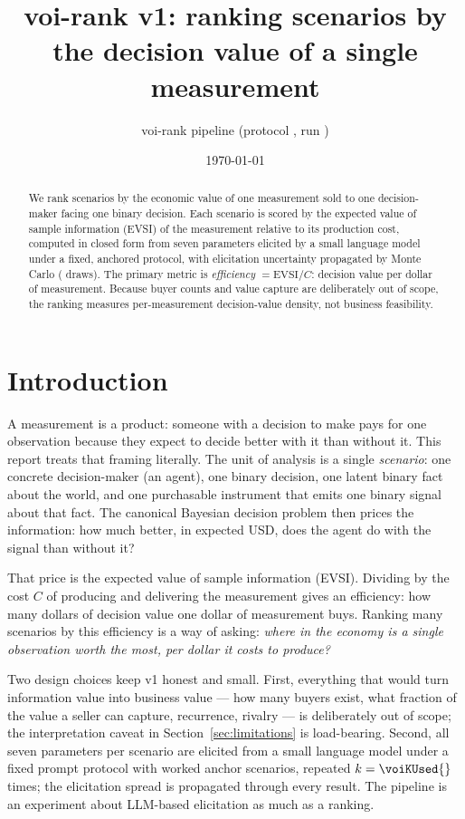 \documentclass[11pt]{article}
\title{voi-rank v1: ranking scenarios by the decision value of a single measurement}
\author{voi-rank pipeline (protocol \voiProtocol, run \voiRunId)}
\date{\today}
\newcommand{\evsi}{\mathrm{EVSI}}
\begin{document}
\maketitle

\begin{abstract}
We rank \voiNRanked{} scenarios by the economic value of one measurement sold to
one decision-maker facing one binary decision. Each scenario is scored by the
expected value of sample information (EVSI) of the measurement relative to its
production cost, computed in closed form from seven parameters elicited by a
small language model under a fixed, anchored protocol, with elicitation
uncertainty propagated by Monte Carlo (\voiNDraws{} draws). The primary metric
is \emph{efficiency} $=\evsi/C$: decision value per dollar of measurement.
Because buyer counts and value capture are deliberately out of scope, the
ranking measures per-measurement decision-value density, not business
feasibility.
\end{abstract}

\section{Introduction}

A measurement is a product: someone with a decision to make pays for one
observation because they expect to decide better with it than without it. This
report treats that framing literally. The unit of analysis is a single
\emph{scenario}: one concrete decision-maker (an agent), one binary decision,
one latent binary fact about the world, and one purchasable instrument that
emits one binary signal about that fact. The canonical Bayesian decision
problem then prices the information: how much better, in expected USD, does the
agent do with the signal than without it?

That price is the expected value of sample information (EVSI). Dividing by the
cost $C$ of producing and delivering the measurement gives an efficiency: how
many dollars of decision value one dollar of measurement buys. Ranking many
scenarios by this efficiency is a way of asking: \emph{where in the economy is
a single observation worth the most, per dollar it costs to produce?}

Two design choices keep v1 honest and small. First, everything that would turn
information value into business value --- how many buyers exist, what fraction
of the value a seller can capture, recurrence, rivalry --- is deliberately out
of scope; the interpretation caveat in Section~\ref{sec:limitations} is load-bearing.
Second, all seven parameters per scenario are elicited from a small language
model under a fixed prompt protocol with worked anchor scenarios, repeated
$k=\voiKUsed{}$ times; the elicitation spread is propagated through every
result. The pipeline is an experiment about LLM-based elicitation as much as a
ranking.
\end{document}
